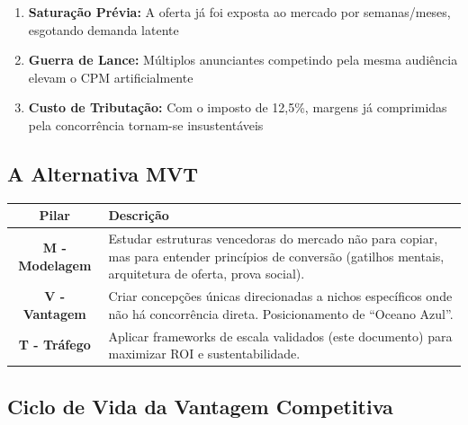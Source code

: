 \documentclass[12pt, a4paper]{article}
\begin{document}
\begin{enumerate}
    \item \textbf{Saturação Prévia:} A oferta já foi exposta ao mercado por semanas/meses, esgotando demanda latente
    \item \textbf{Guerra de Lance:} Múltiplos anunciantes competindo pela mesma audiência elevam o CPM artificialmente
    \item \textbf{Custo de Tributação:} Com o imposto de 12,5\%, margens já comprimidas pela concorrência tornam-se insustentáveis
\end{enumerate}

\subsection{A Alternativa MVT}

\begin{table}[H]
    \centering
    \renewcommand{\arraystretch}{1.5}
    \begin{tabularx}{\textwidth}{c X}
        \toprule
        \rowcolor{tableHeader} \textbf{Pilar} & \textbf{Descrição} \\
        \midrule
        \textbf{M - Modelagem} & Estudar estruturas vencedoras do mercado não para copiar, mas para entender princípios de conversão (gatilhos mentais, arquitetura de oferta, prova social). \\
        \rowcolor{lightGray}
        \textbf{V - Vantagem} & Criar concepções únicas direcionadas a nichos específicos onde não há concorrência direta. Posicionamento de ``Oceano Azul''. \\
        \textbf{T - Tráfego} & Aplicar frameworks de escala validados (este documento) para maximizar ROI e sustentabilidade. \\
        \bottomrule
    \end{tabularx}
\end{table}

\subsection{Ciclo de Vida da Vantagem Competitiva}
\end{document}

